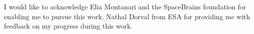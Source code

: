 \begin{acks}
  I would like to acknowledge Elia Montanari and the SpaceBrains foundation for enabling me to pursue this work. Nathal Dorval from ESA for providing me with feedback on my progress during this work. %
\end{acks}